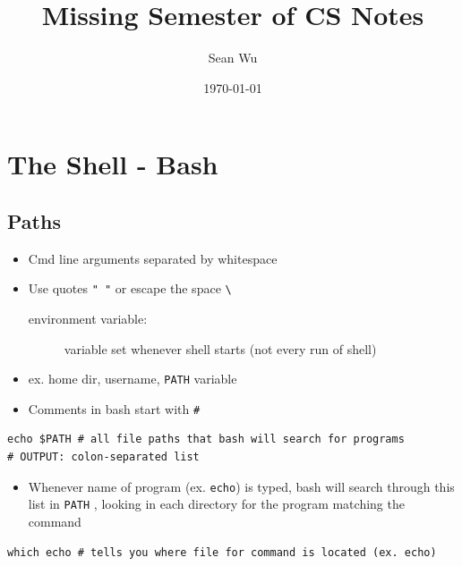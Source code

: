 \documentclass[letterpaper,12pt]{article}
\begin{document}
\title{Missing Semester of CS Notes}
\author{Sean Wu}
\date{\today}
\maketitle

\tableofcontents

\pagebreak

\setlength{\parindent}{0em}
\setlength{\parskip}{1em}

\section{The Shell - Bash}

\subsection{Paths}

\begin{itemize}
 \item Cmd line arguments separated by whitespace
 \item Use quotes \lstinline{" "} or escape the space \lstinline{\ }

       \begin{description}
        \item[environment variable:] variable set whenever shell starts (not every run of shell)
       \end{description}

 \item ex. home dir, username, \lstinline{PATH} variable
 \item Comments in bash start with \lstinline{#}
\end{itemize}

\begin{lstlisting}
echo $PATH # all file paths that bash will search for programs
# OUTPUT: colon-separated list
\end{lstlisting}

\begin{itemize}
 \item Whenever name of program (ex. \lstinline{echo}) is typed, bash will search through this list in \lstinline{PATH} , looking in each directory for the program matching the command
\end{itemize}

\begin{lstlisting}
which echo # tells you where file for command is located (ex. echo)
\end{lstlisting}
\end{document}
